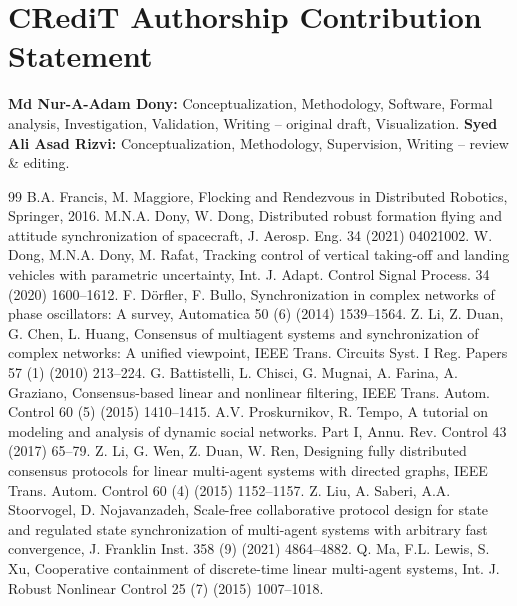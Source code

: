 \documentclass[final,5p,times]{elsarticle}
\theoremstyle{plain}
\theoremstyle{definition}
\theoremstyle{remark}
\begin{document}
\section*{CRediT Authorship Contribution Statement}
\textbf{Md Nur-A-Adam Dony:} Conceptualization, Methodology, Software, Formal analysis, Investigation, Validation, Writing -- original draft, Visualization.
\textbf{Syed Ali Asad Rizvi:} Conceptualization, Methodology, Supervision, Writing -- review \& editing.
\begingroup\small
\begin{thebibliography}{99}
B.A. Francis, M. Maggiore, Flocking and Rendezvous in Distributed Robotics, Springer, 2016.
M.N.A. Dony, W. Dong, Distributed robust formation flying and attitude synchronization of spacecraft, J. Aerosp. Eng. 34 (2021) 04021002.
W. Dong, M.N.A. Dony, M. Rafat, Tracking control of vertical taking-off and landing vehicles with parametric uncertainty, Int. J. Adapt. Control Signal Process. 34 (2020) 1600--1612.
F. D\"{o}rfler, F. Bullo, Synchronization in complex networks of phase oscillators: A survey, Automatica 50 (6) (2014) 1539--1564.
Z. Li, Z. Duan, G. Chen, L. Huang, Consensus of multiagent systems and synchronization of complex networks: A unified viewpoint, IEEE Trans. Circuits Syst. I Reg. Papers 57 (1) (2010) 213--224.
G. Battistelli, L. Chisci, G. Mugnai, A. Farina, A. Graziano, Consensus-based linear and nonlinear filtering, IEEE Trans. Autom. Control 60 (5) (2015) 1410--1415.
A.V. Proskurnikov, R. Tempo, A tutorial on modeling and analysis of dynamic social networks. Part I, Annu. Rev. Control 43 (2017) 65--79.
Z. Li, G. Wen, Z. Duan, W. Ren, Designing fully distributed consensus protocols for linear multi-agent systems with directed graphs, IEEE Trans. Autom. Control 60 (4) (2015) 1152--1157.
Z. Liu, A. Saberi, A.A. Stoorvogel, D. Nojavanzadeh, Scale-free collaborative protocol design for state and regulated state synchronization of multi-agent systems with arbitrary fast convergence, J. Franklin Inst. 358 (9) (2021) 4864--4882.
Q. Ma, F.L. Lewis, S. Xu, Cooperative containment of discrete-time linear multi-agent systems, Int. J. Robust Nonlinear Control 25 (7) (2015) 1007--1018.

\end{thebibliography}
\end{document}
